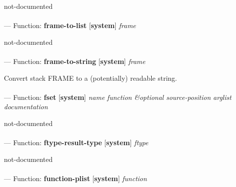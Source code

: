\begin{adjustwidth}{5em}{5em}
not-documented
\end{adjustwidth}

\paragraph{}
\label{SYSTEM:FRAME-TO-LIST}
--- Function: \textbf{frame-to-list} [\textbf{system}] \textit{frame}

\begin{adjustwidth}{5em}{5em}
not-documented
\end{adjustwidth}

\paragraph{}
\label{SYSTEM:FRAME-TO-STRING}
--- Function: \textbf{frame-to-string} [\textbf{system}] \textit{frame}

\begin{adjustwidth}{5em}{5em}
Convert stack FRAME to a (potentially) readable string.
\end{adjustwidth}

\paragraph{}
\label{SYSTEM:FSET}
--- Function: \textbf{fset} [\textbf{system}] \textit{name function \&optional source-position arglist documentation}

\begin{adjustwidth}{5em}{5em}
not-documented
\end{adjustwidth}

\paragraph{}
\label{SYSTEM:FTYPE-RESULT-TYPE}
--- Function: \textbf{ftype-result-type} [\textbf{system}] \textit{ftype}

\begin{adjustwidth}{5em}{5em}
not-documented
\end{adjustwidth}

\paragraph{}
\label{SYSTEM:FUNCTION-PLIST}
--- Function: \textbf{function-plist} [\textbf{system}] \textit{function}

